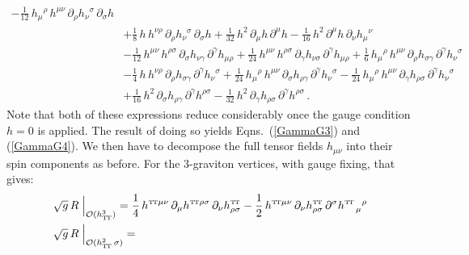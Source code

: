 \documentclass[11pt]{book}
\newcommand\TTspace{ -1pt }
\newcommand\TT{ \scriptscriptstyle{\mathrm{T\hspace{\TTspace}T}} }
\newcommand\hTT{ h_{\scriptscriptstyle{\mathrm{T\hspace{\TTspace}T}}} }
\numberwithin{equation}{chapter}
\begin{document}
\begin{appendices}
\begin{align}
   - \frac{1}{12} \, h_{\mu}{}^{\rho} \, h^{\mu \nu}     \, \partial_{\rho}   h_{\nu}{}^{\sigma} \, \partial_{\sigma} h \nonumber \\
  &+ \frac{1}{8}  \, h                \, h^{\nu \rho}    \, \partial_{\rho}   h_{\nu}{}^{\sigma} \, \partial_{\sigma} h
   + \frac{1}{32} \, h^2                                 \, \partial_{\mu}    h                  \, \partial^{\mu}    h
   - \frac{1}{16} \, h^2                                 \, \partial^{\mu}    h                  \, \partial_{\nu}    h_{\mu}{}^{\nu} \nonumber \\
  &- \frac{1}{12} \, h^{\mu \nu}      \, h^{\rho \sigma} \, \partial_{\sigma} h_{\nu \gamma}     \, \partial^{\gamma} h_{\mu \rho}
   + \frac{1}{24} \, h^{\mu \nu}      \, h^{\rho \sigma} \, \partial_{\gamma} h_{\nu \sigma}     \, \partial^{\gamma} h_{\mu \rho}
   + \frac{1}{6}  \, h_{\mu}{}^{\rho} \, h^{\mu \nu}     \, \partial_{\rho}   h_{\sigma \gamma}  \, \partial^{\gamma} h_{\nu}{}^{\sigma} \nonumber \\
  &- \frac{1}{4}  \, h                \, h^{\nu \rho}    \, \partial_{\rho}   h_{\sigma \gamma}  \, \partial^{\gamma} h_{\nu}{}^{\sigma}
   + \frac{1}{24} \, h_{\mu}{}^{\rho} \, h^{\mu \nu}     \, \partial_{\sigma} h_{\rho \gamma}    \, \partial^{\gamma} h_{\nu}{}^{\sigma}
   - \frac{1}{24} \, h_{\mu}{}^{\rho} \, h^{\mu \nu}     \, \partial_{\gamma} h_{\rho \sigma}    \, \partial^{\gamma} h_{\nu}{}^{\sigma} \nonumber \\
  &+ \frac{1}{16} \, h^2                                 \, \partial_{\sigma} h_{\rho \gamma}    \, \partial^{\gamma} h^{\rho \sigma}
   - \frac{1}{32} \, h^2                                 \, \partial_{\gamma} h_{\rho \sigma}    \, \partial^{\gamma} h^{\rho \sigma} \,.
\end{align}
Note that both of these expressions reduce considerably once the gauge condition
$h=0$ is applied. The result of doing so yields Eqns.~(\ref{GammaG3}) and (\ref{GammaG4}).
We then have to decompose the full tensor fields $h_{\mu\nu}$ into their spin components
as before. For the 3-graviton vertices, with gauge fixing, that gives:
\begin{align}
  &\sqrt{g} \, R \; \Big|_{\mathcal O(\hTT^3)} =
  \frac{1}{4} \, h^{{\TT}\mu \nu} \, \partial_{\mu} h^{{\TT}\rho \sigma} \, \partial_{\nu} h^{{\TT}}_{\rho \sigma}
  - \frac{1}{2} \, h^{{\TT}\mu \nu} \, \partial_{\nu} h^{{\TT}}_{\rho \sigma} \, \partial^{\sigma} h^{{\TT}}_{\quad \mu}{}^{\rho}\\
  &\sqrt{g} \, R \; \Big|_{\mathcal O(\hTT^2 \, \sigma)} =

\end{align}
\end{appendices}
\end{document}
